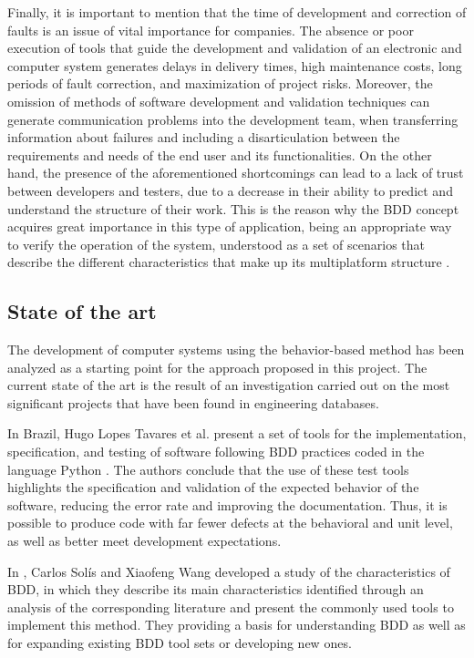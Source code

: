 \documentclass[journal]{IEEEtran}	%
\begin{document}
Finally, it is important to mention that the time of development and correction of faults is an issue of vital importance for companies. The absence or poor execution of tools that guide the development and validation of an electronic and computer system generates delays in delivery times, high maintenance costs, long periods of fault correction, and maximization of project risks. Moreover, the omission of methods of software development and validation techniques can generate communication problems into the development team, when transferring information about failures and including a disarticulation between the requirements and needs of the end user and its functionalities. On the other hand, the presence of the aforementioned shortcomings can lead to a lack of trust between developers and testers, due to a decrease in their ability to predict and understand the structure of their work. This is the reason why the BDD concept acquires great importance in this type of application, being an appropriate way to verify the operation of the system, understood as a set of scenarios that describe the different characteristics that make up its multiplatform structure \cite{nascimento2020behavior,soeken2012assisted,north2010introducing}.


\subsection{State of the art}


The development of computer systems using the behavior-based method has been analyzed as a starting point for the approach proposed in this project. The current state of the art is the result of an investigation carried out on the most significant projects that have been found in engineering databases.

In Brazil, Hugo Lopes Tavares et al. present a set of tools for the implementation, specification, and testing of software following BDD practices coded in the language Python \cite{tavares2010tool}. The authors conclude that the use of these test tools highlights the specification and validation of the expected behavior of the software, reducing the error rate and improving the documentation. Thus, it is possible to produce code with far fewer defects at the behavioral and unit level, as well as better meet development expectations.

In \cite{solis2011study}, Carlos Solís and Xiaofeng Wang developed a study of the characteristics of BDD, in which they describe its main characteristics identified through an analysis of the corresponding literature and present the commonly used tools to implement this method. They providing a basis for understanding BDD as well as for expanding existing BDD tool sets or developing new ones.
\end{document}
